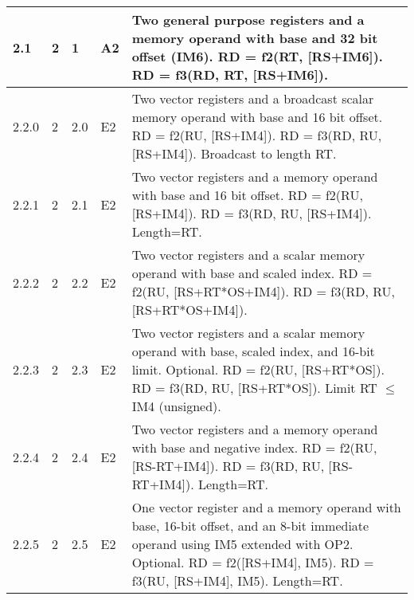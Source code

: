 \documentclass[forwardcom.tex]{subfiles}
\begin{document}
\begin{longtable} {|p{10mm}|p{6mm}|p{9mm}|p{7mm}|p{80mm}|}
\hline
2.1 & 2 & 1 & A2 & Two general purpose registers and a memory operand with base and 32 bit offset (IM6). \newline 
RD = f2(RT, [RS+IM6]). \newline 
RD = f3(RD, RT, [RS+IM6]).\\

\hline
2.2.0 & 2 & 2.0 & E2 & Two vector registers and a broadcast scalar memory operand with base and 16 bit offset.\newline 
RD = f2(RU, [RS+IM4]). \newline 
RD = f3(RD, RU, [RS+IM4]). \newline
Broadcast to length RT.\\

\hline
2.2.1 & 2 & 2.1 & E2 & Two vector registers and a memory operand with base and 16 bit offset.\newline 
RD = f2(RU, [RS+IM4]). \newline 
RD = f3(RD, RU, [RS+IM4]).\newline
Length=RT.\\

\hline
2.2.2 & 2 & 2.2 & E2 & Two vector registers and a scalar memory operand with base and scaled index. \newline 
RD = f2(RU, [RS+RT*OS+IM4]). \newline 
RD = f3(RD, RU, [RS+RT*OS+IM4]). \\

\hline
2.2.3 & 2 & 2.3 & E2 & Two vector registers and a scalar memory operand with base, scaled index, and 16-bit limit. Optional. \newline 
RD = f2(RU, [RS+RT*OS]). \newline 
RD = f3(RD, RU, [RS+RT*OS]).\newline
Limit RT $\leq$ IM4 (unsigned).\\

\hline
2.2.4 & 2 & 2.4 & E2 & Two vector registers and a memory operand with base and negative index. \newline 
RD = f2(RU, [RS-RT+IM4]). \newline 
RD = f3(RD, RU, [RS-RT+IM4]). \newline 
Length=RT. \\

\hline
2.2.5 & 2 & 2.5  & E2 & One vector register and a memory operand with base, 16-bit offset, and an 8-bit immediate operand using IM5 extended with OP2. Optional. \newline 
RD = f2([RS+IM4], IM5). \newline 
RD = f3(RU, [RS+IM4], IM5). \newline 
Length=RT.\\


\end{longtable}
\end{document}
